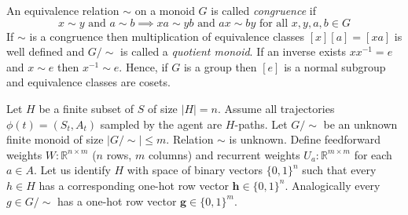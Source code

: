 \documentclass[oneside,english,logo]{amuthesis}
\begin{document}
An equivalence relation $\sim$ on a monoid $G$ is called \textit{congruence} if
\[
x\sim y\text{ and } a \sim b \implies xa\sim yb\text{ and }ax\sim by\text{ for all }x,y,a,b\in G
\]
If $\sim$ is a congruence then multiplication of equivalence classes $[x][a]=[xa]$ is well defined and $G/{\sim}$ is called a \textit{quotient monoid}. If an inverse exists $xx^{-1}=e$ and $x\sim e$ then $x^{-1} \sim e$. Hence, if $G$ is a group then $[e]$ is a normal subgroup and equivalence classes are cosets. 

Let $H$ be a finite subset of $S$ of size $|H|=n$. Assume all trajectories $\phi(t)=(S_t,A_t)$ sampled by the agent are $H$-paths. Let $G/{\sim}$ be an unknown finite monoid of size $|G/{\sim}|\le m$. Relation $\sim$ is unknown. Define feedforward weights $W:\mathbb{R}^{n\times m}$ ($n$ rows, $m$ columns) and recurrent weights $U_a:\mathbb{R}^{m\times m}$ for each $a\in A$. Let us identify $H$ with space of binary vectors $\{0,1\}^n$ such that every $h\in H$ has a corresponding one-hot row vector $\boldsymbol{h}\in \{0,1\}^n$. Analogically every $g\in G/{\sim}$ has a one-hot row vector $\boldsymbol{g}\in \{0,1\}^m$.
\end{document}

